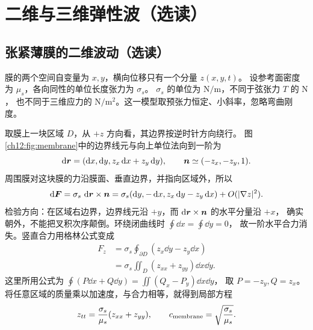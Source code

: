 \section{二维与三维弹性波（选读）}
\subsection{张紧薄膜的二维波动（选读）}

膜的两个空间自变量为 $x,y$，横向位移只有一个分量 $z(x,y,t)$。
设参考面密度为 $\mu_s$，各向同性的单位长度张力为 $\sigma_s$。
$\sigma_s$ 的单位为 $\mathrm{N/m}$，不同于弦张力 $T$ 的 $\mathrm N$，
也不同于三维应力的 $\mathrm{N/m^2}$。这一模型取预张力恒定、小斜率，忽略弯曲刚度。

取膜上一块区域 $D$，从 $+z$ 方向看，其边界按逆时针方向绕行。
图\ref{ch12:fig:membrane}中的边界线元与向上单位法向到一阶为
\[
 \mathop{}\!\mathrm d\bm{r}=(\mathop{}\!\mathrm d x,\mathop{}\!\mathrm d y,z_x\mathop{}\!\mathrm d x+z_y\mathop{}\!\mathrm d y),\qquad
 \bm{n}\simeq(-z_x,-z_y,1).
\]
周围膜对这块膜的力沿膜面、垂直边界，并指向区域外，所以
\[
 \mathop{}\!\mathrm d\bm{F}=\sigma_s\,\mathop{}\!\mathrm d\bm{r}\times\bm{n}
 =\sigma_s(\mathop{}\!\mathrm d y,-\mathop{}\!\mathrm d x,z_x\mathop{}\!\mathrm d y-z_y\mathop{}\!\mathrm d x)+O(|\nabla z|^2).
\]
检验方向：在区域右边界，边界线元沿 $+y$，而 $\mathop{}\!\mathrm d\bm{r}\times\bm{n}$ 的水平分量沿 $+x$，
确实朝外，不能把叉积次序颠倒。环绕闭曲线时 $\oint\dd x=\oint\dd y=0$，
故一阶水平合力消失。竖直合力用格林公式变成
\begin{align}
 F_z&=\sigma_s\oint_{\partial D}(z_x\dd y-z_y\dd x)\\
 &=\sigma_s\iint_D(z_{xx}+z_{yy})\dd x\dd y.
 \label{ch12:eq:membrane-force}
\end{align}
这里所用公式为 $\oint(P\dd x+Q\dd y)=\iint(Q_x-P_y)\dd x\dd y$，
取 $P=-z_y,Q=z_x$。将任意区域的质量乘以加速度，与合力相等，就得到局部方程
\begin{equation}
 z_{tt}=\frac{\sigma_s}{\mu_s}(z_{xx}+z_{yy}),\qquad
 c_{\rm membrane}=\sqrt{\frac{\sigma_s}{\mu_s}}.
 \label{ch12:eq:membrane-wave}
\end{equation}

